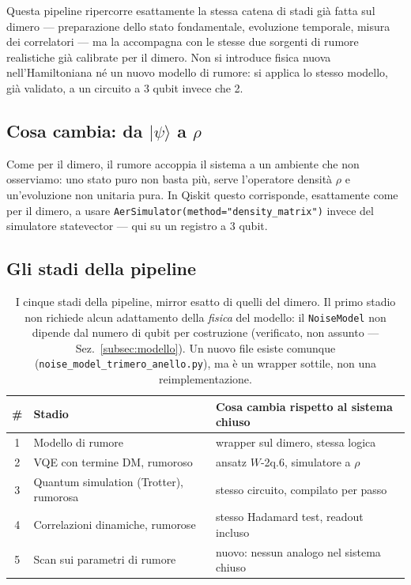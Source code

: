\documentclass[11pt,a4paper]{article}
\newcommand{\ket}[1]{\lvert #1 \rangle}
\begin{document}
Questa pipeline ripercorre esattamente la stessa catena di stadi già
fatta sul dimero --- preparazione dello stato fondamentale, evoluzione
temporale, misura dei correlatori --- ma la accompagna con le stesse due
sorgenti di rumore realistiche già calibrate per il dimero. Non si
introduce fisica nuova nell'Hamiltoniana né un nuovo modello di rumore:
si applica lo stesso modello, già validato, a un circuito a 3 qubit
invece che 2.

\subsection{Cosa cambia: da \texorpdfstring{$\ket{\psi}$}{|psi>} a \texorpdfstring{$\rho$}{rho}}

Come per il dimero, il rumore accoppia il sistema a un ambiente che non
osserviamo: uno stato puro non basta più, serve l'operatore densità
$\rho$ e un'evoluzione non unitaria pura. In Qiskit questo corrisponde,
esattamente come per il dimero, a usare
\texttt{AerSimulator(method=\allowbreak"density\_matrix")} invece del
simulatore statevector --- qui su un registro a 3 qubit.

\subsection{Gli stadi della pipeline}
\label{sec:stadi}

\begin{table}[htbp]
\centering
\begin{tabular}{@{}cll@{}}
\toprule
\# & Stadio & Cosa cambia rispetto al sistema chiuso \\
\midrule
1 & Modello di rumore & wrapper sul dimero, stessa logica \\
2 & VQE con termine DM, rumoroso & ansatz $W$-2q.6, simulatore a $\rho$ \\
3 & Quantum simulation (Trotter), rumorosa & stesso circuito, compilato per passo \\
4 & Correlazioni dinamiche, rumorose & stesso Hadamard test, readout incluso \\
5 & Scan sui parametri di rumore & nuovo: nessun analogo nel sistema chiuso \\
\bottomrule
\end{tabular}
\caption{I cinque stadi della pipeline, mirror esatto di quelli del
dimero. Il primo stadio non richiede alcun adattamento della
\emph{fisica} del modello: il \texttt{NoiseModel} non dipende dal
numero di qubit per costruzione (verificato, non assunto ---
Sez.~\ref{subsec:modello}). Un nuovo file esiste comunque
(\texttt{noise\_model\_\allowbreak trimero\_anello.py}), ma è un
wrapper sottile, non una reimplementazione.}
\end{table}
\FloatBarrier
\end{document}
